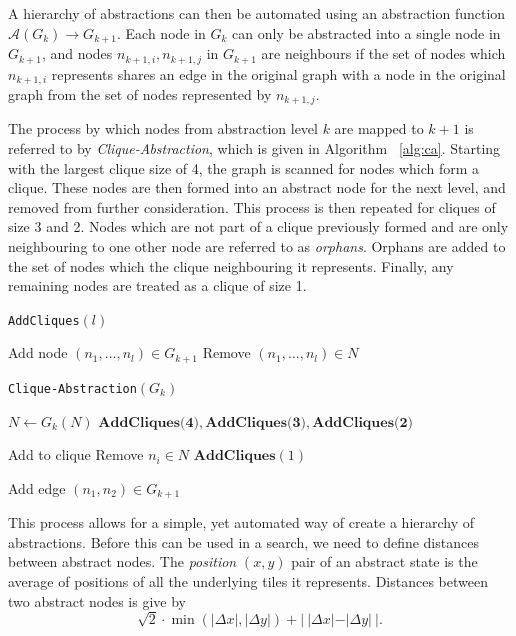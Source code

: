 \documentclass[letterpaper]{article} %
\begin{document}
A hierarchy of abstractions can then be automated using an abstraction function $\mathcal{A}(G_k) \to G_{k+1}$.
Each node in $G_k$ can only be abstracted into a single node in $G_{k+1}$,
and nodes $n_{k+1,i}, n_{k+1, j}$ in $G_{k+1}$ are neighbours if the set of nodes which $n_{k+1,i}$ represents 
shares an edge in the original graph with a node in the original graph from the set of nodes represented by $n_{k+1,j}$.

The process by which nodes from abstraction level $k$ are mapped to $k+1$ is referred to by \textit{Clique-Abstraction},
which is given in Algorithm ~\ref{alg:ca}.
Starting with the largest clique size of 4, 
the graph is scanned for nodes which form a clique. 
These nodes are then formed into an abstract node for the next level, and removed from further consideration.
This process is then repeated for cliques of size 3 and 2.
Nodes which are not part of a clique previously formed and are only neighbouring to one other node are referred to as \textit{orphans}.
Orphans are added to the set of nodes which the clique neighbouring it represents.
Finally, any remaining nodes are treated as a clique of size 1.

\begin{algorithm}[ht]
\caption{\texttt{AddCliques}$(l)$}
\label{alg:isclique}
\DontPrintSemicolon
{} {
     {
    Add node $(n_1, \dots, n_l) \in G_{k+1}$\;
    Remove $(n_1, \dots, n_l) \in N$\;
    }
}
\end{algorithm}

\begin{algorithm}[ht]
\caption{\texttt{Clique-Abstraction}$(G_k)$}
\label{alg:ca}
\DontPrintSemicolon
{}
$N \gets G_k(N)$ \;
$\textbf{AddCliques(4)}, \textbf{AddCliques(3)}, \textbf{AddCliques(2)}$\;

 {
     {
        Add to clique\;
        Remove $n_i \in N$\;
    }
}
$\textbf{AddCliques}(1)$\;

 {
     {
    Add edge $(n_1, n_2) \in G_{k+1}$\;
    }
}
\end{algorithm}

This process allows for a simple, yet automated way of create a hierarchy of abstractions.
Before this can be used in a search, we need to define distances between abstract nodes.
The \textit{position} $(x, y)$ pair of an abstract state is the average of positions of all the underlying tiles it represents.
Distances between two abstract nodes is give by
\begin{equation}\label{eq:distances}
    \sqrt{2} \cdot \min \left( |\Delta x|, |\Delta y| \right) + | \ |\Delta x| - |\Delta y| \ |.
\end{equation}
\end{document}
